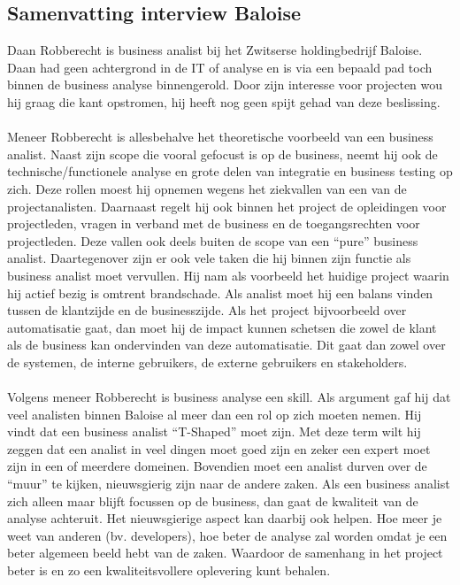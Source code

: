 \documentclass{hogent-article}
\begin{document}
\subsection{ Samenvatting interview Baloise}

Daan Robberecht is business analist bij het Zwitserse holdingbedrijf Baloise. Daan had geen achtergrond in de IT of analyse en is via een bepaald pad toch binnen de business analyse binnengerold. Door zijn interesse voor projecten wou hij graag die kant opstromen, hij heeft nog geen spijt gehad van deze beslissing.
\\~~\\
Meneer Robberecht is allesbehalve het theoretische voorbeeld van een business analist. Naast zijn scope die vooral gefocust is op de business, neemt hij ook de technische/functionele analyse en grote delen van integratie en business testing op zich. Deze rollen moest hij opnemen wegens het ziekvallen van een van de projectanalisten. Daarnaast regelt hij ook binnen het project de opleidingen voor projectleden, vragen in verband met de business en de toegangsrechten voor projectleden. Deze vallen ook deels buiten de scope van een “pure” business analist. Daartegenover zijn er ook vele taken die hij binnen zijn functie als business analist moet vervullen. Hij nam als voorbeeld het huidige project waarin hij actief bezig is omtrent brandschade. Als analist moet hij een balans vinden tussen de klantzijde en de businesszijde. Als het project bijvoorbeeld over automatisatie gaat, dan moet hij de impact kunnen schetsen die zowel de klant als de business kan ondervinden van deze automatisatie. Dit gaat dan zowel over de systemen, de interne gebruikers, de externe gebruikers en stakeholders.
\\~~\\
Volgens meneer Robberecht is business analyse een skill. Als argument gaf hij dat veel analisten binnen Baloise al meer dan een rol op zich moeten nemen. Hij vindt dat een business analist “T-Shaped” moet zijn. Met deze term wilt hij zeggen dat een analist in veel dingen moet goed zijn en zeker een expert moet zijn in een of meerdere domeinen. Bovendien moet een analist durven over de “muur” te kijken, nieuwsgierig zijn naar de andere zaken. Als een business analist zich alleen maar blijft focussen op de business, dan gaat de kwaliteit van de analyse achteruit. Het nieuwsgierige aspect kan daarbij ook helpen. Hoe meer je weet van anderen (bv. developers), hoe beter de analyse zal worden omdat je een beter algemeen beeld hebt van de zaken. Waardoor de samenhang in het project beter is en zo een kwaliteitsvollere oplevering kunt behalen.
\end{document}
